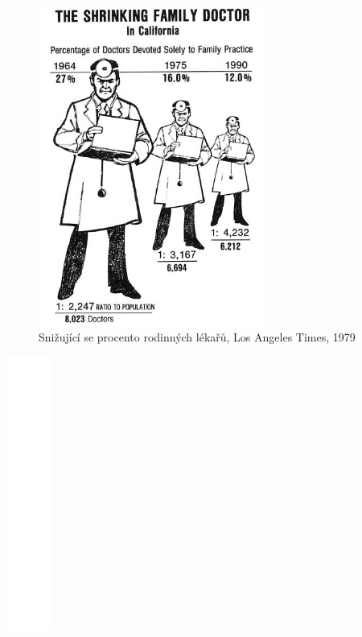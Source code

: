 \documentclass[12pt,]{article}
\begin{document}
\begin{minipage}[H]{0.475\textwidth}
 \begin{figure}[H]
\centering
    \includegraphics[height = 10.5cm]{fig/tufte_shrinking_doctor}
    \caption{Snižující se procento rodinných lékařů, Los Angeles Times, 1979}
    \label{fig05}
 \end{figure}
\end{minipage}\begin{minipage}[H]{0.05\textwidth}
 \includegraphics[height = 9cm]{fig/blank_v}
\end{minipage}\begin{minipage}[H]{0.475\textwidth}
 \begin{figure}[H]
\centering

\end{figure}
\end{minipage}
\end{document}

